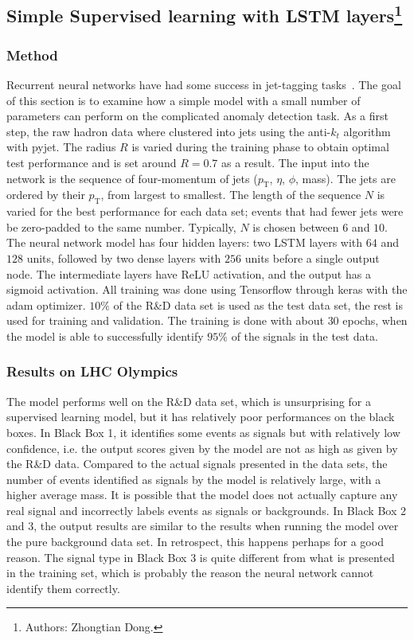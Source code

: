 \documentclass[a4paper,11pt]{article}
\begin{document}
 \FloatBarrier
\subsection[Simple Supervised learning with LSTM layers]{Simple Supervised learning with LSTM layers\footnote{Authors: Zhongtian Dong.}}

\label{sec:LSTM}

\subsubsection{Method}
\label{sec:lstm}

 Recurrent neural networks have had some success in jet-tagging tasks~\cite{Guest:2018yhq}. The goal of this section is to examine how a simple model with a small number of parameters can perform on the complicated anomaly detection task.  As a first step, the raw hadron data where clustered into jets using the anti-$k_t$ algorithm with pyjet. The radius $R$ is varied during the training phase to obtain optimal test performance and is set around $R=0.7$ as a result. The input into the network is the sequence of four-momentum of jets ($p_\text{T}$, $\eta$, $\phi$, mass). The jets are ordered by their $p_\text{T}$, from largest to smallest. The length of the sequence $N$ is varied for the best performance for each data set; events that had fewer jets were be zero-padded to the same number. Typically, $N$ is chosen between $6$ and $10$. The neural network model has four hidden layers: two LSTM layers with $64$ and $128$ units, followed by two dense layers with $256$ units before a single output node. The intermediate layers have ReLU activation, and the output has a sigmoid activation. All training was done using Tensorflow through keras with the adam optimizer. $10\%$ of the R\&D data set is used as the test data set, the rest is used for training and validation. The training is done with about $30$ epochs, when the model is able to successfully identify $95\%$ of the signals in the test data.

\subsubsection{Results on LHC Olympics}
\label{sec:results}

The model performs well on the R\&D data set, which is unsurprising for a supervised learning model, but it has relatively poor performances on the black boxes. In Black Box 1,  it identifies some events as signals but with relatively low confidence, i.e. the output scores given by the model are not as high as given by the R\&D data. Compared to the actual signals presented in the data sets, the number of events identified as signals by the model is relatively large, with a higher average mass. It is possible that the model does not actually capture any real signal and incorrectly labels events as signals or backgrounds. In Black Box 2 and 3, the output results are similar to the results when running the model over the pure background data set. In retrospect, this happens perhaps for a good reason. The signal type in Black Box 3 is quite different from what is presented in the training set, which is probably the reason the neural network cannot identify them correctly.
\end{document}
